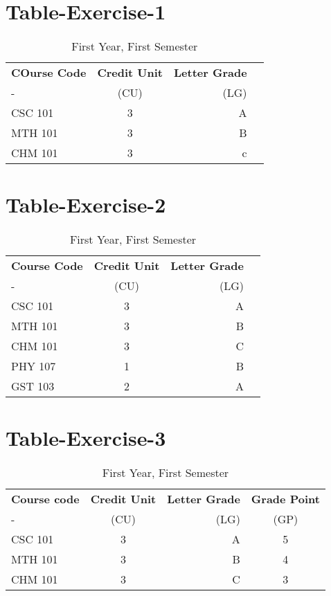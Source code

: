 \documentclass{article}
\begin{document}
	\section{Table-Exercise-1}
	\begin{table}[h!]
		\begin{center}
			\caption{First Year, First Semester}
			\label{tab:table1}
			\begin{tabular}{l|c|r|c}
				\textbf{COurse Code} & \textbf{Credit Unit} & \textbf{Letter Grade}\\
				- & (CU) & (LG) \\
				\hline
				CSC 101 & 3 & A\\
				MTH 101 & 3 & B\\
				CHM 101 & 3 & c\\
				\end{tabular}
		\end{center}
	\end{table}


\section{Table-Exercise-2}
	\begin{table} [h!]
		\begin{center}
			\caption{First Year, First Semester}
			\label{tab:table1}
			\begin{tabular}{l|c|r|c}
				\textbf{Course Code} & \textbf{Credit Unit} & \textbf{Letter Grade}\\
				- & (CU) & (LG) \\
				\hline 
				CSC 101 & 3 & A\\
				MTH 101 & 3 & B\\
				CHM 101 & 3 & C\\
				PHY 107 & 1 & B\\
				GST 103 & 2 & A\\
				\end{tabular}
		\end{center}
	\end{table}
\section{Table-Exercise-3}
\begin{table} [h!]
	\begin{center}
		\caption{First Year, First Semester}
		\label{tab:table1}
		\begin{tabular}{l|c|r|c}
			\textbf{Course code} & \textbf{Credit Unit} & \textbf{Letter Grade} & \textbf{Grade Point}\\ - & (CU) & (LG) & (GP) \\
			\hline
			CSC 101 & 3 & A & 5\\
			MTH 101 & 3 & B & 4\\
			CHM 101 & 3 & C & 3\\
			\end{tabular}
	\end{center}
\end{table}
\newpage
\end{document}
